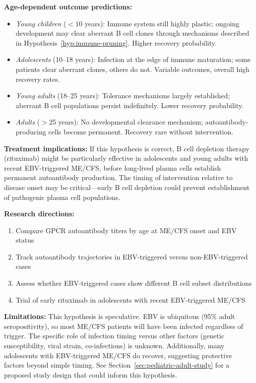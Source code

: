 \begin{hypothesis}
\textbf{Age-dependent outcome predictions:}
\begin{itemize}
    \item \textit{Young children} ($<$10 years): Immune system still highly plastic; ongoing development may clear aberrant B cell clones through mechanisms described in Hypothesis~\ref{hyp:immune-pruning}. Higher recovery probability.
    \item \textit{Adolescents} (10--18 years): Infection at the edge of immune maturation; some patients clear aberrant clones, others do not. Variable outcomes, overall high recovery rates.
    \item \textit{Young adults} (18--25 years): Tolerance mechanisms largely established; aberrant B cell populations persist indefinitely. Lower recovery probability.
    \item \textit{Adults} ($>$25 years): No developmental clearance mechanism; autoantibody-producing cells become permanent. Recovery rare without intervention.
\end{itemize}

\textbf{Treatment implications:}
If this hypothesis is correct, B cell depletion therapy (rituximab) might be particularly effective in adolescents and young adults with recent EBV-triggered ME/CFS, before long-lived plasma cells establish permanent autoantibody production. The timing of intervention relative to disease onset may be critical---early B cell depletion could prevent establishment of pathogenic plasma cell populations.

\textbf{Research directions:}
\begin{enumerate}
    \item Compare GPCR autoantibody titers by age at ME/CFS onset and EBV status
    \item Track autoantibody trajectories in EBV-triggered versus non-EBV-triggered cases
    \item Assess whether EBV-triggered cases show different B cell subset distributions
    \item Trial of early rituximab in adolescents with recent EBV-triggered ME/CFS
\end{enumerate}

\textbf{Limitations:}
This hypothesis is speculative. EBV is ubiquitous (95\% adult seropositivity), so most ME/CFS patients will have been infected regardless of trigger. The specific role of infection timing versus other factors (genetic susceptibility, viral strain, co-infections) is unknown. Additionally, many adolescents with EBV-triggered ME/CFS do recover, suggesting protective factors beyond simple timing. See Section~\ref{sec:pediatric-adult-study} for a proposed study design that could inform this hypothesis.
\end{hypothesis}

